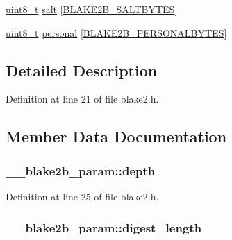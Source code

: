 \begin{DoxyCompactItemize}
\hyperlink{stdint_8h_aba7bc1797add20fe3efdf37ced1182c5}{uint8\+\_\+t} \hyperlink{struct____blake2b__param_ad53420f1ce170abad76166fe101a46b5}{salt} \mbox{[}\hyperlink{blake2_8h_a55df020abc59e40eb12965cf08eca1b5ac6bdac02af2cbdd70f76ae63c1d3fa1e}{B\+L\+A\+K\+E2\+B\+\_\+\+S\+A\+L\+T\+B\+Y\+T\+E\+S}\mbox{]}
\item 
\hyperlink{stdint_8h_aba7bc1797add20fe3efdf37ced1182c5}{uint8\+\_\+t} \hyperlink{struct____blake2b__param_af8ec1991e3458f8c8cddb70fd0ee7ce5}{personal} \mbox{[}\hyperlink{blake2_8h_a55df020abc59e40eb12965cf08eca1b5a83ed255c34f4b1603226f7e3854d57d6}{B\+L\+A\+K\+E2\+B\+\_\+\+P\+E\+R\+S\+O\+N\+A\+L\+B\+Y\+T\+E\+S}\mbox{]}
\end{DoxyCompactItemize}


\subsection{Detailed Description}


Definition at line 21 of file blake2.\+h.



\subsection{Member Data Documentation}
\hypertarget{struct____blake2b__param_ad7bf5379885d9b50022af74eae90a525}{}
\subsubsection[{depth}]{ \+\_\+\+\_\+blake2b\+\_\+param\+::depth}\label{struct____blake2b__param_ad7bf5379885d9b50022af74eae90a525}


Definition at line 25 of file blake2.\+h.

\hypertarget{struct____blake2b__param_acf01a39fc0926ef22177a9bda686163f}{}
\subsubsection[{digest\+\_\+length}]{ \+\_\+\+\_\+blake2b\+\_\+param\+::digest\+\_\+length}\label{struct____blake2b__param_acf01a39fc0926ef22177a9bda686163f}


